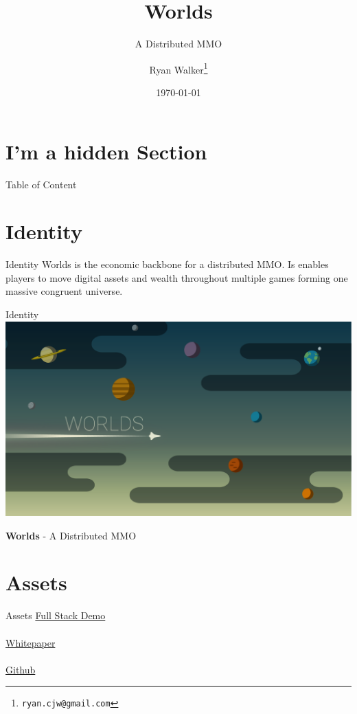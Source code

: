 \documentclass[final, xcolor=pdftex, dvipsnames, table, aspectratio=169, 14pt]{beamer}
\begin{document}
\title[Worlds]{Worlds}
\subtitle[]{A Distributed MMO}
\author[]{Ryan Walker\footnote{\texttt{ryan.cjw@gmail.com}}}
\date{\today} %


\begin{frame}
  \maketitle
\end{frame}

\section*{I'm a hidden Section}
\begin{frame}{Table of Content} %
    \small 
    \tableofcontents
\end{frame}

\section{Identity}
\begin{frame}{Identity}
Worlds is the economic backbone for a distributed MMO. Is enables players to move digital assets and wealth throughout multiple games forming one massive congruent universe. 
\end{frame}

\begin{frame}{Identity}
\centering
\includegraphics[scale=0.15]{Header.png} 

\textbf{Worlds} - A Distributed MMO
\end{frame}

\section{Assets}
\begin{frame}{Assets}
\href{https://www.youtube.com/watch?v=OrOZVr-j92A}{Full Stack Demo}\label{vid}
\\~\\

\href{https://github.com/Machine-Hum/Worlds/raw/master/Worlds-Whitepaper/whitepaper.pdf}{Whitepaper}
\\~\\

\href{worldsmmo.com}{Github}
\end{frame}
\end{document}
